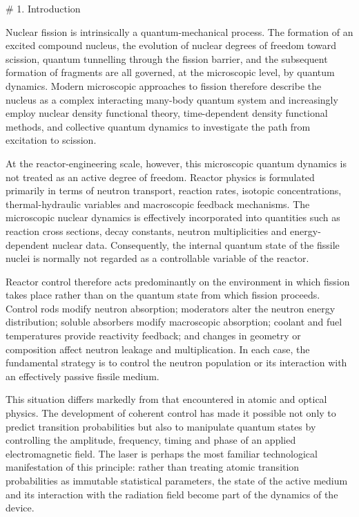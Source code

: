# 1. Introduction

Nuclear fission is intrinsically a quantum-mechanical process. The formation of an excited compound nucleus, the evolution of nuclear degrees of freedom toward scission, quantum tunnelling through the fission barrier, and the subsequent formation of fragments are all governed, at the microscopic level, by quantum dynamics. Modern microscopic approaches to fission therefore describe the nucleus as a complex interacting many-body quantum system and increasingly employ nuclear density functional theory, time-dependent density functional methods, and collective quantum dynamics to investigate the path from excitation to scission.

At the reactor-engineering scale, however, this microscopic quantum dynamics is not treated as an active degree of freedom. Reactor physics is formulated primarily in terms of neutron transport, reaction rates, isotopic concentrations, thermal-hydraulic variables and macroscopic feedback mechanisms. The microscopic nuclear dynamics is effectively incorporated into quantities such as reaction cross sections, decay constants, neutron multiplicities and energy-dependent nuclear data. Consequently, the internal quantum state of the fissile nuclei is normally not regarded as a controllable variable of the reactor.

Reactor control therefore acts predominantly on the environment in which fission takes place rather than on the quantum state from which fission proceeds. Control rods modify neutron absorption; moderators alter the neutron energy distribution; soluble absorbers modify macroscopic absorption; coolant and fuel temperatures provide reactivity feedback; and changes in geometry or composition affect neutron leakage and multiplication. In each case, the fundamental strategy is to control the neutron population or its interaction with an effectively passive fissile medium.

This situation differs markedly from that encountered in atomic and optical physics. The development of coherent control has made it possible not only to predict transition probabilities but also to manipulate quantum states by controlling the amplitude, frequency, timing and phase of an applied electromagnetic field. The laser is perhaps the most familiar technological manifestation of this principle: rather than treating atomic transition probabilities as immutable statistical parameters, the state of the active medium and its interaction with the radiation field become part of the dynamics of the device.

